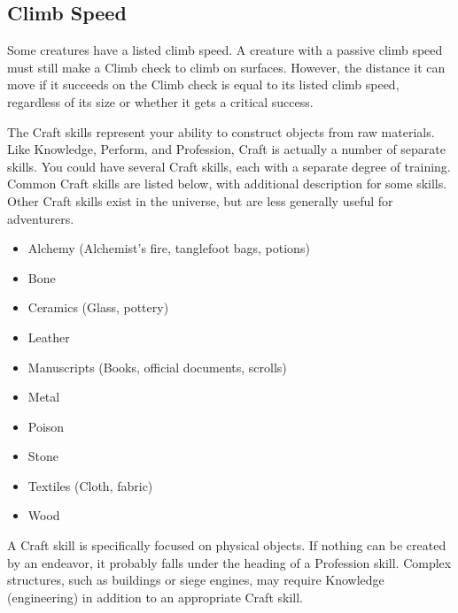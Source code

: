   \subsection{Climb Speed}\label{Climb Speed}
    Some creatures have a listed climb speed.
    A creature with a passive climb speed must still make a Climb check to climb on surfaces.
    However, the distance it can move if it succeeds on the Climb check is equal to its listed climb speed, regardless of its size or whether it gets a critical success.

\newpage
{}
  The Craft skills represent your ability to construct objects from raw materials.
  Like Knowledge, Perform, and Profession, Craft is actually a number of separate skills.
  You could have several Craft skills, each with a separate degree of training.
  Common Craft skills are listed below, with additional description for some skills.
  Other Craft skills exist in the universe, but are less generally useful for adventurers.

  \begin{itemize}
    \item Alchemy (Alchemist's fire, tanglefoot bags, potions)
    \item Bone
    \item Ceramics (Glass, pottery)
    \item Leather
    \item Manuscripts (Books, official documents, scrolls)
    \item Metal
    \item Poison
    \item Stone
    \item Textiles (Cloth, fabric)
    \item Wood
  \end{itemize}

  A Craft skill is specifically focused on physical objects. If nothing can be created by an endeavor, it probably falls under the heading of a Profession skill. Complex structures, such as buildings or siege engines, may require Knowledge (engineering) in addition to an appropriate Craft skill.

